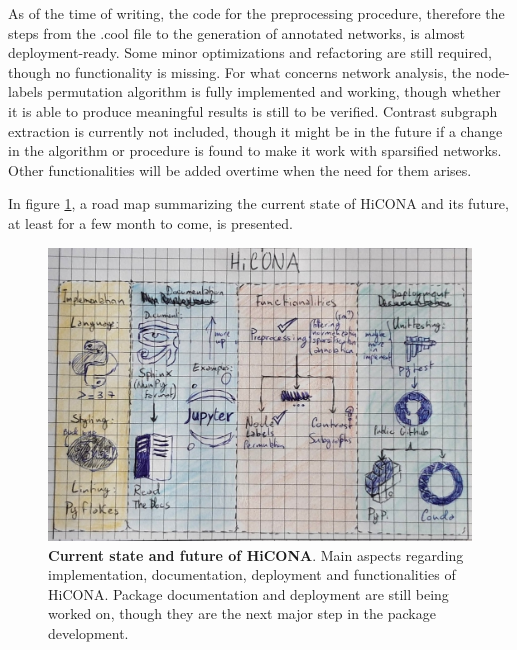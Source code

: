 As of the time of writing, the code for the preprocessing procedure, therefore the steps from the .cool file to the generation of annotated networks, is almost deployment-ready. Some minor optimizations and refactoring are still required, though no functionality is missing. For what concerns network analysis, the node-labels permutation algorithm is fully implemented and working, though whether it is able to produce meaningful results is still to be verified. Contrast subgraph extraction is currently not included, though it might be in the future if a change in the algorithm or procedure is found to make it work with sparsified networks. Other functionalities will be added overtime when the need for them arises.

In figure \ref{fig:roadmap}, a road map summarizing the current state of HiCONA and its future, at least for a few month to come, is presented.

\begin{figure}[ht]
  \centering
  \includegraphics[width=1\textwidth]{roadmap.jpeg}
  \caption{\textbf{Current state and future of HiCONA}. Main aspects regarding implementation, documentation, deployment and functionalities of HiCONA. Package documentation and deployment are still being worked on, though they are the next major step in the package development.}
  \label{fig:roadmap}
\end{figure}
